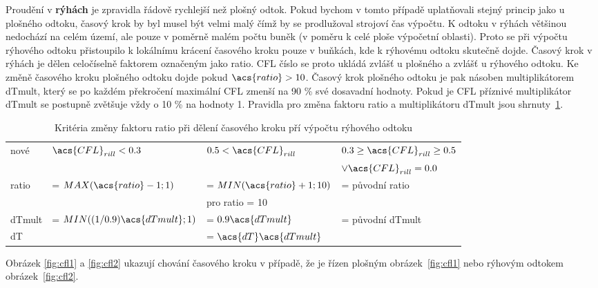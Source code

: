   Proudění v {\bf rýhách} je zpravidla řádově rychlejší než plošný odtok. Pokud bychom v tomto případě uplatňovali stejný princip jako u plošného odtoku, časový krok by byl musel být velmi malý čímž by se prodlužoval strojoví čas výpočtu. K odtoku v rýhách většinou nedochází na celém území, ale pouze v poměrně malém počtu buněk (v poměru k celé ploše výpočetní oblasti). Proto se při výpočtu rýhového odtoku přistoupilo k lokálnímu krácení časového kroku pouze v buňkách, kde k rýhovému odtoku skutečně dojde. Časový krok v rýhách je dělen celočíselně faktorem označeným jako \acs{ratio}. CFL číslo se proto ukládá zvlášť u plošného a zvlášť u rýhového odtoku. Ke změně časového kroku plošného odtoku dojde pokud $\acs{ratio} > 10$. Časový krok plošného odtoku je pak násoben multiplikátorem \acs{dTmult}, který se po každém překročení maximální  \acs{CFL} zmenší na 90 \% své dosavadní hodnoty. Pokud je \acs{CFL} příznivé multiplikátor \acs{dTmult} se postupně zvětšuje vždy o 10 \% na hodnoty 1. Pravidla pro změna faktoru \acs{ratio} a multiplikátoru \acs{dTmult} jsou shrnuty~\ref{tab:cflrill}.
  \begin{table}[t!]
    \centering
    \caption{Kritéria změny faktoru \acs{ratio} při dělení časového kroku pří výpočtu rýhového odtoku}
    \label{tab:cflrill}
    {\small
    \begin{tabular}{llll}
      \hline
        nové  &  $\acs{CFL}_{rill} < 0.3 $ & $ 0.5 < \acs{CFL}_{rill}$ & $ 0.3 \geq \acs{CFL}_{rill} \geq 0.5 $ \\
        & & & $\lor \acs{CFL}_{rill} = 0.0 $ \\
        \hline
        \hline
        \acs{ratio} &  = $MAX(\acs{ratio} - 1;1)$ &  = $MIN(\acs{ratio} + 1;10)$ & = původní \acs{ratio}\\
                     &                              &  pro \acs{ratio} = 10  &                            \\
        \acs{dTmult} &  = $MIN((1/0.9)\acs{dTmult};1)$ &  = $0.9\acs{dTmult}$ & = původní \acs{dTmult}\\
        \acs{dT}    &  & \multicolumn{2}{l}{= $\acs{dT}\acs{dTmult}$} \\
        \hline
        
    \end{tabular}
    }
  \end{table}
  
  
  Obrázek \ref{fig:cfl1} a \ref{fig:cfl2} ukazují chování časového kroku v případě, že je řízen plošným obrázek~\ref{fig:cfl1} nebo rýhovým odtokem obrázek~\ref{fig:cfl2}. 
  
